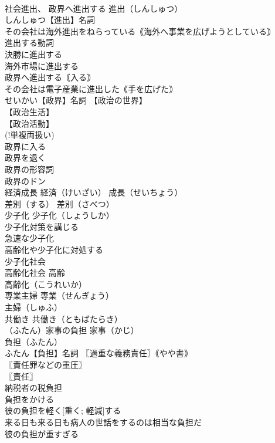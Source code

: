 \documentclass[8pt]{extreport}
\begin{document}
\begin{CJK}{UTF8}{min}
\\	社会進出、 政界へ進出する		進出（しんしゅつ）
\\	しんしゅつ【進出】名詞 
\\	その会社は海外進出をねらっている｟海外へ事業を広げようとしている｠ 
\\	進出する動詞 
\\	決勝に進出する 
\\	海外市場に進出する 
\\	政界へ進出する｟入る｠ 
\\	その会社は電子産業に進出した｟手を広げた｠ 
\\	せいかい【政界】名詞 【政治の世界】
\\	【政治生活】
\\	【政治活動】
\\	(!単複両扱い) 
\\	政界に入る 
\\	政界を退く 
\\	政界の形容詞 
\\	政界のドン 
\\	経済成長		経済（けいざい） 成長（せいちょう） 
\\	差別（する）		差別（さべつ） 
\\	少子化		少子化（しょうしか） 
\\	少子化対策を講じる 
\\	急速な少子化 
\\	高齢化や少子化に対処する 
\\	少子化社会 
\\	高齢化社会		高齢 
\\	高齢化（こうれいか）
\\	専業主婦		専業（せんぎょう）
\\	主婦（しゅふ）
\\	共働き		共働き（ともばたらき） 
\\	（ふたん）家事の負担		家事（かじ）
\\	負担（ふたん）
\\	ふたん【負担】名詞 〖過重な義務責任〗｟やや書｠
\\	〖責任罪などの重圧〗
\\	〖責任〗
\\	納税者の税負担 
\\	負担をかける 
\\	彼の負担を軽く[重く; 軽減]する 
\\	来る日も来る日も病人の世話をするのは相当な負担だ 
\\	彼の負担が重すぎる 

\end{CJK}
\end{document}
